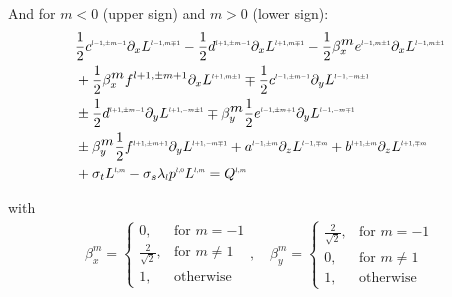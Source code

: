 And for $m<0$ (upper sign) and $m>0$ (lower sign):
\begin{align}
&
\frac{1}{2}c^{\scaleto{l-1,\pm m-1}{4pt}}\partial_x L^{\scaleto{l-1,m\mp 1}{4pt}}
-\frac{1}{2}d^{\scaleto{l+1,\pm m-1}{4pt}}\partial_x L^{\scaleto{l+1,m\mp 1}{4pt}}
-\frac{1}{2}\beta_x^{\scaleto{m}{4pt}}e^{\scaleto{l-1,m\pm 1}{4pt}}\partial_x L^{\scaleto{l-1,m\pm 1}{4pt}}
\nonumber
\\&
+\frac{1}{2}\beta_x^{\scaleto{m}{4pt}}f^{l+1,\pm m+1}\partial_x L^{\scaleto{l+1,m\pm 1}{4pt}}
\mp \frac{1}{2}c^{\scaleto{l-1,\pm m-1}{4pt}}\partial_y L^{\scaleto{l-1,-m\pm 1}{4pt}}
\nonumber
\\&
\pm \frac{1}{2}d^{\scaleto{l+1,\pm m-1}{4pt}}\partial_y L^{\scaleto{l+1,-m \pm 1}{4pt}}
\mp \beta_y^{\scaleto{m}{4pt}}\frac{1}{2}e^{\scaleto{l-1,\pm m+1}{4pt}}\partial_y L^{\scaleto{l-1,-m\mp 1}{4pt}}
\nonumber
\\&
\pm \beta_y^{\scaleto{m}{4pt}}\frac{1}{2}f^{\scaleto{l+1,\pm m+1}{4pt}}\partial_y L^{\scaleto{l+1,-m\mp 1}{4pt}}
+a^{\scaleto{l-1,\pm m}{4pt}}\partial_z L^{\scaleto{l-1,\mp m}{4pt}}
+b^{\scaleto{l+1,\pm m}{4pt}}\partial_z L^{\scaleto{l+1,\mp m}{4pt}}
\nonumber
\\&
+\sigma_t L^{\scaleto{l,m}{4pt}}
-\sigma_s\lambda_{\scaleto{l}{4pt}}p^{\scaleto{l,0}{4pt}}L^{\scaleto{l,m}{4pt}}
= Q^{\scaleto{l,m}{4pt}}
\label{eq:rpn_m_>_z}
\end{align}

with
\begin{align*}
\label{eq:real_sh_basis}
\beta_x^{m}=
\left\{
\begin{array}{ll}
0, & \text{for } m = -1\\
\frac{2}{\sqrt{2}}, & \text{for } m \neq 1\\
1, & \text{otherwise }
\end{array}
\right.
,\quad
\beta_y^{m}=
\left\{
\begin{array}{ll}
\frac{2}{\sqrt{2}}, & \text{for } m = -1\\
0, & \text{for } m \neq 1\\
1, & \text{otherwise }
\end{array}
\right.
\end{align*}

